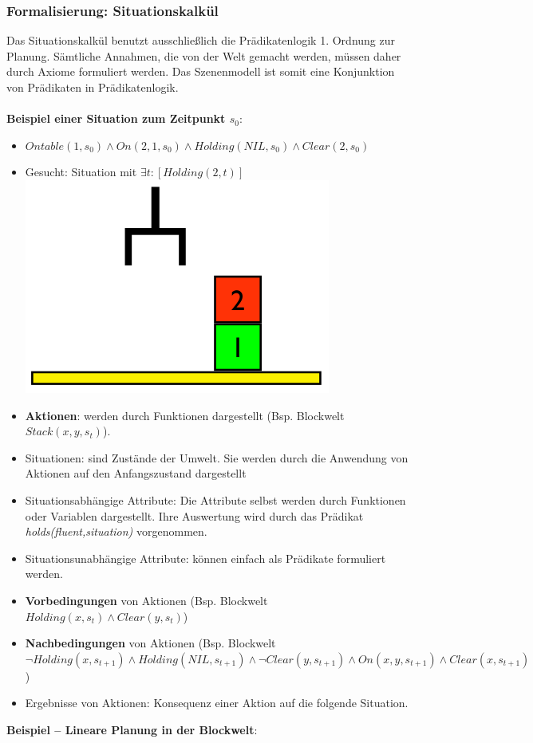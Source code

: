 \subsubsection{Formalisierung: Situationskalkül}
Das Situationskalkül benutzt ausschließlich die Prädikatenlogik 1. Ordnung zur Planung.
Sämtliche Annahmen, die von der Welt gemacht werden, müssen daher durch Axiome formuliert werden.
Das Szenenmodell ist somit eine Konjunktion von Prädikaten in Prädikatenlogik.\\ \\
\textbf{Beispiel einer Situation zum Zeitpunkt $s_0$}:
\begin{itemize}
	\item[] $Ontable(1, s_0) \land On(2, 1, s_0) \land Holding(NIL, s_0) \land Clear(2, s_0)$
	\item[] Gesucht: Situation mit $\exists t: \left[Holding(2, t)\right]$\\
	\includegraphics[width=.2\textwidth]{figures/ch06_sk-bsp.png}
\end{itemize}
\begin{itemize}
	\item \textbf{Aktionen}: werden durch Funktionen dargestellt (Bsp. Blockwelt $Stack(x,y,s_t)$).
	\item Situationen: sind Zustände der Umwelt.
	Sie werden durch die Anwendung von Aktionen auf den Anfangszustand dargestellt
	\item Situationsabhängige Attribute: Die Attribute selbst werden durch Funktionen oder Variablen dargestellt.
	Ihre Auswertung wird durch das Prädikat \emph{holds(fluent,situation)} vorgenommen.
	\item Situationsunabhängige Attribute: können einfach als Prädikate formuliert werden.
	\item \textbf{Vorbedingungen} von Aktionen (Bsp. Blockwelt $Holding(x,s_t) \wedge Clear(y,s_t)$)
	\item \textbf{Nachbedingungen} von Aktionen (Bsp. Blockwelt $\neg Holding(x, s_{t+1}) \wedge Holding(NIL, s_{t+1}) \wedge \neg Clear(y, s_{t+1}) \wedge On(x,y,s_{t+1}) \wedge Clear(x, s_{t+1})$)
	\item Ergebnisse von Aktionen: Konsequenz einer Aktion auf die folgende Situation.
\end{itemize}
\textbf{Beispiel -- Lineare Planung in der Blockwelt}:
